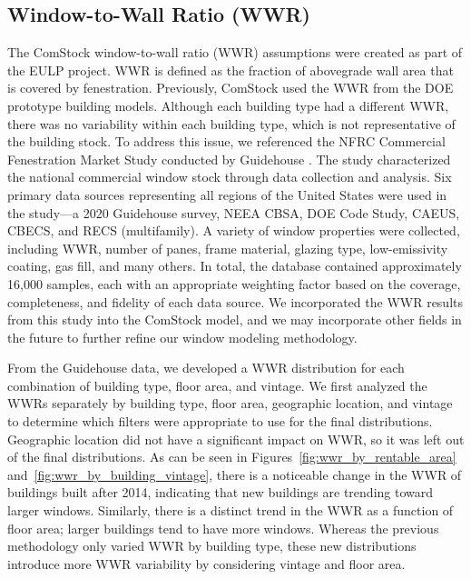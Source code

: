 \pagebreak

\subsection{Window-to-Wall Ratio (WWR)}
The ComStock window-to-wall ratio (WWR) assumptions were created as part of the EULP project. WWR is defined as the fraction of abovegrade wall area that is covered by fenestration. Previously, ComStock used the WWR from the DOE prototype building models. Although each building type had a different WWR, there was no variability within each building type, which is not representative of the building stock. To address this issue, we referenced the NFRC Commercial Fenestration Market Study conducted by Guidehouse \citep{guidehouse_nfrc_window_report}. The study characterized the national commercial window stock through data collection and analysis. Six primary data sources representing all regions of the United States were used in the study---a 2020 Guidehouse survey, NEEA CBSA, DOE Code Study, CAEUS, CBECS, and RECS (multifamily). A variety of window properties were collected, including WWR, number of panes, frame material, glazing type, low-emissivity coating, gas fill, and many others. In total, the database contained approximately 16,000 samples, each with an appropriate weighting factor based on the coverage, completeness, and fidelity of each data source. We incorporated the WWR results from this study into the ComStock model, and we may incorporate other fields in the future to further refine our window modeling methodology.

From the Guidehouse data, we developed a WWR distribution for each combination of building type, floor area, and vintage. We first analyzed the WWRs separately by building type, floor area, geographic location, and vintage to determine which filters were appropriate to use for the final distributions. Geographic location did not have a significant impact on WWR, so it was left out of the final distributions. As can be seen in Figures~\ref{fig:wwr_by_rentable_area} and~\ref{fig:wwr_by_building_vintage}, there is a noticeable change in the WWR of buildings built after 2014, indicating that new buildings are trending toward larger windows. Similarly, there is a distinct trend in the WWR as a function of floor area; larger buildings tend to have more windows. Whereas the previous methodology only varied WWR by building type, these new distributions introduce more WWR variability by considering vintage and floor area.


